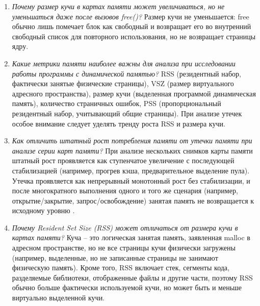\begin{enumerate}
	Карта виртуальной памяти (/proc/pid/maps) показывает области отображения адресного пространства процесса (начальный/конечный адрес, права доступа, источник отображения). 
	Кучу можно идентифицировать по: анонимному отображению с правами rw-p и меткой [heap] (в старых ядрах/раскладке через brk) либо по большому количеству анонимных rw-p областей, созданных через mmap (в современных glibc при многопоточности/крупных выделениях).
	\item \textit{Почему размер кучи в картах памяти может увеличиваться, но не уменьшаться даже после вызовов free()?}\newline 
	Размер кучи не уменьшается: free обычно лишь помечает блок как свободный и возвращает его во внутренний свободный список для повторного использования, но не возвращает страницы ядру.
	\item \textit{Какие метрики памяти наиболее важны для анализа при исследовании работы программы с динамической памятью?}\newline 
	RSS (резидентный набор, фактически занятые физические страницы), 
	VSZ (размер виртуального адресного пространства), 
	размер кучи (выделенная программой динамическая память), количество страничных ошибок, 
	PSS (пропорциональный резидентный набор, учитывающий общие страницы). 
	При анализе утечек особое внимание следует уделять тренду роста RSS и размера кучи.
	\item \textit{Как отличить штатный рост потребления памяти от утечки памяти при анализе серии карт памяти?}\newline 
	При анализе нескольких снимков карты памяти штатный рост проявляется как ступенчатое увеличение с последующей стабилизацией (например, прогрев кэша, предварительное выделение пула).
	Утечка проявляется как непрерывный монотонный рост без стабилизации, и после многократного выполнения одного и того же сценария (например, открытие/закрытие, запрос/освобождение) занятая память не возвращается к исходному уровню .
	\item \textit{Почему Resident Set Size (RSS) может отличаться от размера кучи в картах памяти?}\newline 
	Куча -- это логическая занятая память, заявленная malloc в адресном пространстве, но не все страницы кучи физически загружены (например, выделенные, но не записанные страницы не занимают физическую память). 
	Кроме того, RSS включает стек, сегменты кода, разделяемые библиотеки, отображенные файлы и другие части, поэтому RSS обычно больше фактически используемой кучи, но может быть и меньше виртуально выделенной кучи.
\end{enumerate}
